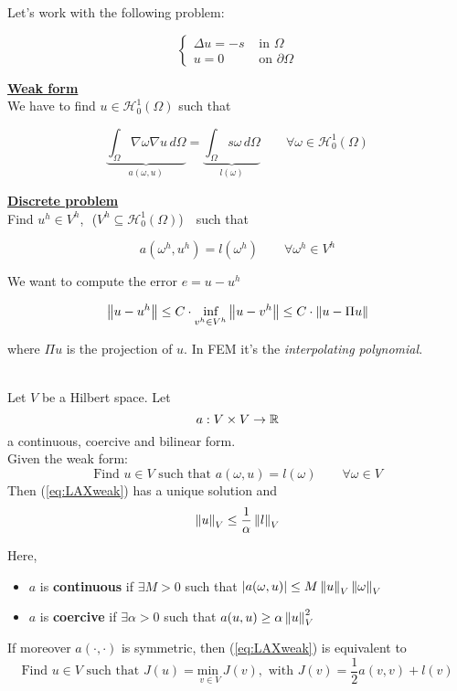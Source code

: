 Let's work with the following problem:

\begin{equation}\label{eq:LAXexample}
    \begin{cases}
      \Delta u = -s &\text{ in } \Omega \\
      u = 0         &\text{ on } \partial\Omega
    \end{cases}
\end{equation}

\underline{\textbf{Weak form}}\\

We have to find $u\in \mathcal{H}_0^1(\Omega)$ such that

\[
  \underbrace{\int_\Omega \nabla\omega\nabla u \, d\Omega}_{a(\omega, u)} = \underbrace{\int_{\Omega} s\omega \, d\Omega}_{l(\omega)} \qquad \forall \omega \in \mathcal{H}_0^1(\Omega)
\]

\underline{\textbf{Discrete problem}}\\

Find $u^h \in V^h$,$\,\,$ ($V^h \subseteq \mathcal{H}_0^1(\Omega)$) $\,\,$ such that 

\[
  a(\omega^h, u^h) = l(\omega^h) \qquad \forall \omega^h \in V^h
\]

We want to compute the error $e = u - u^h$

\[
  \left\lVert u-u^h\right\rVert \leq C\cdot \underset{v^h\in V^h}{\text{inf}} \left\lVert u-v^h\right\rVert \leq C\cdot\left\lVert u-\Pi u\right\rVert
\]

where $\Pi u$ is the projection of $u$. In FEM it's the \textit{interpolating polynomial}.\\
\begin{lemma}\label{LMthm}\-\\
  Let $V$ be a Hilbert space. Let $$a: V\times V \to \mathbb{R}$$ a continuous, coercive and bilinear form.\\
  Given the weak form:
  \begin{equation}\label{eq:LAXweak}
      \text{Find } u \in V \text{ such that } a(\omega, u) = l(\omega) \qquad \forall \omega\in V
  \end{equation}
  Then (\ref{eq:LAXweak}) has a unique solution and $$\left\lVert u\right\rVert_V \leq \frac{1}{\alpha}\left\lVert l\right\rVert_V$$
  
  Here,
  \begin{itemize}
      \item[] $a$ is \textbf{continuous} if $\exists M>0$ such that $\left\vert a(\omega, u) \right\vert \leq M\left\lVert u\right\rVert_V\left\lVert\omega\right\rVert_V$
      
      \item[] $a$ is \textbf{coercive} if $\exists \alpha>0$ such that $a(u,u) \geq \alpha\left\lVert u\right\rVert_V^2$
  \end{itemize}
  
  If moreover $a(\cdot, \cdot)$ is symmetric, then (\ref{eq:LAXweak}) is equivalent to $$      \text{Find } u \in V \text{ such that } J(u) = \underset{v\in V}{\text{min }}J(v), \text{ with } J(v) = \frac{1}{2}a(v,v) + l(v)$$
\end{lemma}

